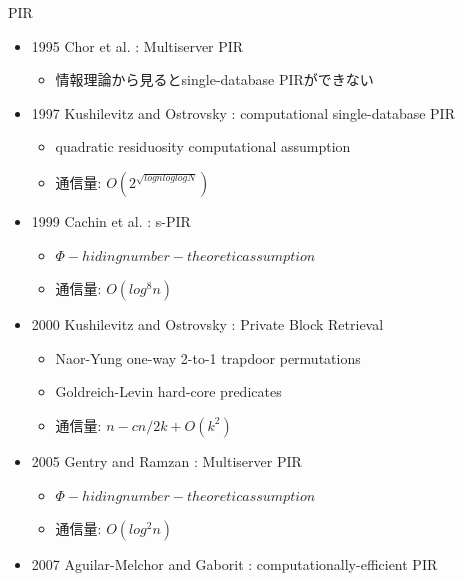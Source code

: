\documentclass[14pt,xcolor=dvipsnames,table,dvipdfmx]{beamer}
\begin{document}
\begin{frame}[t,allowframebreaks]{PIR}
\fontsize{12pt}{7.2}\selectfont
	\begin{block}{}
		\begin{itemize}
			\item 1995 Chor et al. : Multiserver PIR             
			\begin{itemize}
				\item 情報理論から見るとsingle-database PIRができない              
			\end{itemize}
			\item 1997 Kushilevitz and Ostrovsky : computational single-database PIR             
			\begin{itemize}
				\item quadratic residuosity computational assumption
				\item  通信量: $O(2^{\sqrt{lognloglogN}})$             
			\end{itemize}
			\item 1999 Cachin et al. : s-PIR            
			\begin{itemize}
				\item $\Phi-hiding number-theoretic assumption$
				\item  通信量: $O(log^8n)$ 
			\end{itemize}
			\item 2000 Kushilevitz and Ostrovsky : Private Block Retrieval             
			\begin{itemize}
				\item Naor-Yung one-way 2-to-1 trapdoor permutations
              			\item Goldreich-Levin hard-core predicates
				\item  通信量: $n-cn/2k + O(k^2)$ 
			\end{itemize}
		\end{itemize}
	\end{block}
	\begin{block}{}
		\begin{itemize}
			\item 2005 Gentry and Ramzan : Multiserver PIR             
			\begin{itemize}
				\item $\Phi-hiding number-theoretic assumption$     
				\item  通信量: $O(log^2n)$         
			\end{itemize}
			\item 2007 Aguilar-Melchor and Gaborit : computationally-efficient PIR             

\end{itemize}
\end{block}
\end{frame}
\end{document}
